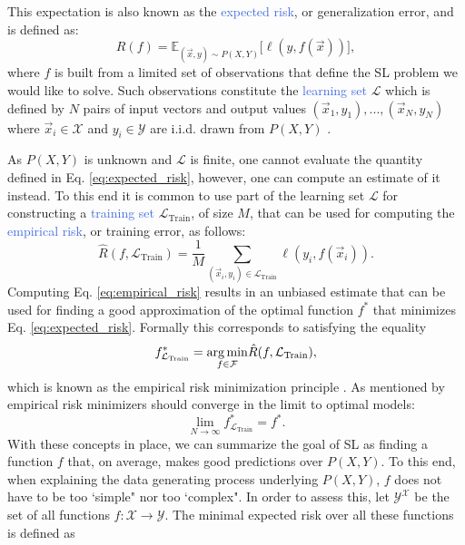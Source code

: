This expectation is also known as the \textcolor{RoyalBlue}{expected risk}, or generalization error, and is defined as:
\begin{equation}
	R(f) = \mathds{E}_{(\vec{x},y)\sim P(X,Y)} \big[\ell(y,f(\vec{x}))\big],
\label{eq:expected_risk}
\end{equation}
where $f$ is built from a limited set of observations that define the SL problem we would like to solve. Such observations constitute the \textcolor{RoyalBlue}{learning set} $\mathcal{L}$ which is defined by $N$ pairs of input vectors and output values $(\vec{x}_1, y_1),...,(\vec{x}_N, y_N)$ where $\vec{x}_i \in \mathcal{X}$ and $y_i \in \mathcal{Y}$ are i.i.d. drawn from $P(X,Y)$ \cite{geurts2002contributions}. 

As $P(X,Y)$ is unknown and $\mathcal{L}$ is finite, one cannot evaluate the quantity defined in Eq. \ref{eq:expected_risk}, however, one can compute an estimate of it instead. To this end it is common to use part of the learning set $\mathcal{L}$ for constructing a \textcolor{RoyalBlue}{training set} $\mathcal{L}_{\text{Train}}$, of size $M$, that can be used for computing the \textcolor{RoyalBlue}{empirical risk}, or training error, as follows:
\begin{equation}
	\hat{R}(f,\mathcal{L}_\text{Train}) = \frac{1}{M} \sum_{(\vec{x}_i, y_i)\in \mathcal{L}_{\text{Train}}} \ell(y_i,f(\vec{x}_i)).
\label{eq:empirical_risk}
\end{equation}
Computing Eq. \ref{eq:empirical_risk} results in an unbiased estimate that can be used for finding a good approximation of the optimal function $f^{*}$ that minimizes Eq. \ref{eq:expected_risk}. Formally this corresponds to satisfying the equality
\begin{equation}
	f^{*}_{\mathcal{L}_{\text{Train}}} = \underset{f\in\mathcal{F}}{\operatorname*{arg\,min}}\hat{R}(f,\mathcal{L}_{\text{Train}}),
\end{equation}
which is known as the empirical risk minimization principle \cite{vapnik1992principles}. As mentioned by \citet{vapnik2015uniform} empirical risk minimizers should converge in the limit to optimal models:
\begin{equation}
	\lim_{N \to \infty} f^{*}_{\mathcal{L}_\text{Train}} = f^{*}.
\end{equation}
With these concepts in place, we can summarize the goal of SL as finding a function $f$ that, on average, makes good predictions over $P(X,Y)$. To this end, when explaining the data generating process underlying $P(X,Y)$, $f$ does not have to be too `simple" nor too `complex". In order to assess this, let $\mathcal{Y}^{\mathcal{X}}$ be the set of all functions $f:\mathcal{X}\rightarrow\mathcal{Y}$. The minimal expected risk over all these functions is defined as
